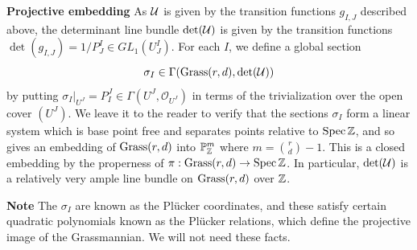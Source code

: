 \begin{construction}
\medskip
\textbf{Projective embedding }
As $\mathcal{U}$ is given by the transition functions $g_{I,J}$ described above,
the determinant line bundle
$\det(\mathcal{U})$ is given by the transition functions
$\det(g_{I,J}) = 1/P^I_J \in GL_1(U^I_J)$.
For each $I$, we define a global section
$$\sigma_I \in \Gamma(\operatorname{Grass}(r,d),\det(\mathcal{U}))$$
by putting $\sigma_I|_{U^J} = P^J_I \in
\Gamma(U^J,{\mathcal O}_{U^J})$ in terms of the trivialization over the open cover
$(U^J)$.
We leave it to the reader to verify that the sections $\sigma_I$ form \notready
a linear system which is base point free and separates points
relative to $\operatorname{Spec} \mathbb{Z}$, and so gives an embedding of
$\operatorname{Grass}(r,d)$ into $\mathbb{P}^m_{\mathbb{Z}}$ where $m = {r\choose d}-1$.
This is a closed embedding by the properness of
$\pi:\operatorname{Grass}(r,d) \to \operatorname{Spec} \mathbb{Z}$. In particular, $\det(\mathcal{U})$
is a relatively very ample line bundle on $\operatorname{Grass}(r,d)$ over $\mathbb{Z}$.
\end{construction}


\medskip

{\footnotesize
\textbf{Note } The $\sigma_I$ are known as the Pl\"ucker coordinates,
and these satisfy certain quadratic polynomials known as the Pl\"ucker
relations, which define the projective image of the Grassmannian.
We will not need these facts. }%
